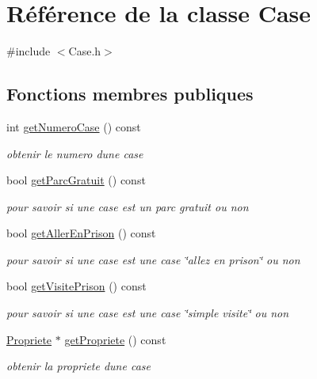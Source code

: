 \hypertarget{classCase}{}\section{Référence de la classe Case}
\label{classCase}


{\ttfamily \#include $<$Case.\+h$>$}

\subsection*{Fonctions membres publiques}
\begin{DoxyCompactItemize}
\item 
int \hyperlink{classCase_a680ba46223bfc211c3c8d4393d829685}{get\+Numero\+Case} () const 
\begin{DoxyCompactList}\small\item\em obtenir le numero d\textquotesingle{}une case \end{DoxyCompactList}\item 
bool \hyperlink{classCase_aa417d2219ab48229e0632ccad977d15a}{get\+Parc\+Gratuit} () const 
\begin{DoxyCompactList}\small\item\em pour savoir si une case est un parc gratuit ou non \end{DoxyCompactList}\item 
bool \hyperlink{classCase_aafee1cdcc373c578d83e0e3bdc1c89ea}{get\+Aller\+En\+Prison} () const 
\begin{DoxyCompactList}\small\item\em pour savoir si une case est une case \char`\"{}allez en prison\char`\"{} ou non \end{DoxyCompactList}\item 
bool \hyperlink{classCase_af68aa1113d232ec3c73aa60e36cf842c}{get\+Visite\+Prison} () const 
\begin{DoxyCompactList}\small\item\em pour savoir si une case est une case \char`\"{}simple visite\char`\"{} ou non \end{DoxyCompactList}\item 
\hyperlink{classPropriete}{Propriete} $\ast$ \hyperlink{classCase_acaf2cc4372def79a29ada8fa1b6e7dbe}{get\+Propriete} () const 
\begin{DoxyCompactList}\small\item\em obtenir la propriete d\textquotesingle{}une case \end{DoxyCompactList}\item 

\end{DoxyCompactItemize}
